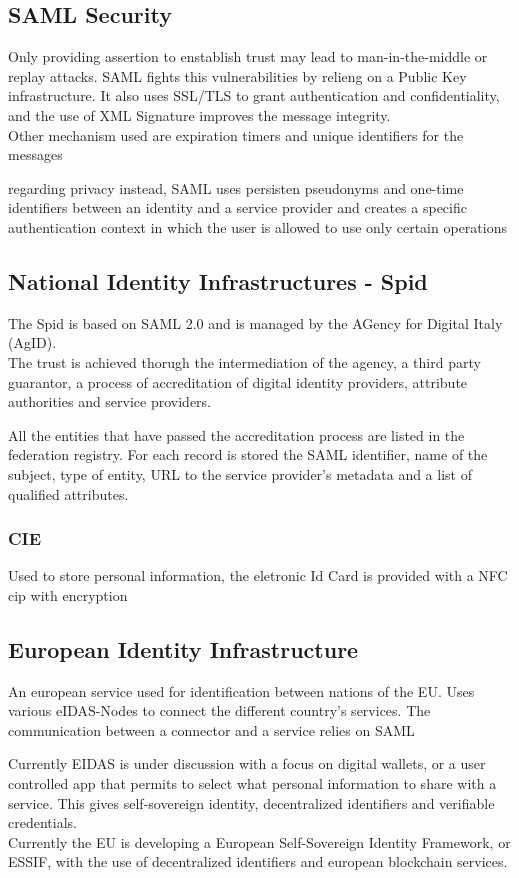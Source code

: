 \documentclass[12pt, a4paper]{article}
\begin{document}
\subsection{SAML Security}
Only providing assertion to enstablish trust may lead to man-in-the-middle or replay attacks. SAML fights this 
vulnerabilities by relieng on a Public Key infrastructure. It also uses SSL/TLS to grant authentication and 
confidentiality, and the use of XML Signature improves the message integrity.\\ Other mechanism used are
expiration timers and unique identifiers for the messages

regarding privacy instead, SAML uses persisten pseudonyms and one-time identifiers between an identity and a
service provider and creates a specific authentication context in which the user is allowed to use only certain 
operations

\subsection{National Identity Infrastructures - Spid}
The Spid is based on SAML 2.0 and is managed by the AGency for Digital Italy (AgID).\\The trust is achieved
thorugh the intermediation of the agency, a third party guarantor, a process of accreditation of digital 
identity providers, attribute authorities and service providers. 

All the entities that have passed the accreditation process are listed in the federation registry. For each record
is stored the SAML identifier, name of the subject, type of entity, URL to the service provider's metadata and a 
list of qualified attributes.

\subsubsection{CIE}
Used to store personal information, the eletronic Id Card is provided with a NFC cip with encryption

\subsection{European Identity Infrastructure}
An european service used for identification between nations of the EU. Uses various eIDAS-Nodes to connect the 
different country's services. The communication between a connector and a service relies on SAML

Currently EIDAS is under discussion with a focus on digital wallets, or a user controlled app that permits to 
select what personal information to share with a service. This gives self-sovereign identity, decentralized 
identifiers and verifiable credentials.\\Currently the EU is developing a European Self-Sovereign Identity Framework,
or ESSIF, with the use of decentralized identifiers and european blockchain services.
\end{document}
